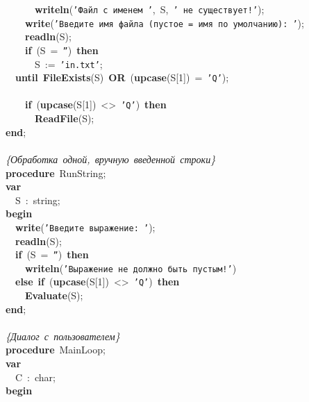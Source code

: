 \mbox{}\ \ \ \ \ \ \textbf{writeln}(\texttt{'Файл\ с\ именем\ '},\ S,\ \texttt{'\ не\ существует!'}); \\
\mbox{}\ \ \ \ \textbf{write}(\texttt{'Введите\ имя\ файла\ (пустое\ =\ имя\ по\ умолчанию):\ '}); \\
\mbox{}\ \ \ \ \textbf{readln}(S); \\
\mbox{}\ \ \ \ \textbf{if}\ (S\ =\ \texttt{''})\ \textbf{then} \\
\mbox{}\ \ \ \ \ \ S\ :=\ \texttt{'in.txt'}; \\
\mbox{}\ \ \textbf{until}\ \textbf{FileExists}(S)\ \textbf{OR}\ (\textbf{upcase}(S[1])\ =\ \texttt{'Q'}); \\
\mbox{} \\
\mbox{}\ \ \ \ \textbf{if}\ (\textbf{upcase}(S[1])\ \textless{}\textgreater{}\ \texttt{'Q'})\ \textbf{then} \\
\mbox{}\ \ \ \ \ \ \textbf{ReadFile}(S); \\
\mbox{}\textbf{end}; \\
\mbox{} \\
\mbox{}\textit{\{Обработка\ одной,\ вручную\ введенной\ строки\}} \\
\mbox{}\textbf{procedure}\ RunString; \\
\mbox{}\textbf{var} \\
\mbox{}\ \ S\ :\ string; \\
\mbox{}\textbf{begin} \\
\mbox{}\ \ \textbf{write}(\texttt{'Введите\ выражение:\ '}); \\
\mbox{}\ \ \textbf{readln}(S); \\
\mbox{}\ \ \textbf{if}\ (S\ =\ \texttt{''})\ \textbf{then} \\
\mbox{}\ \ \ \ \textbf{writeln}(\texttt{'Выражение\ не\ должно\ быть\ пустым!'}) \\
\mbox{}\ \ \textbf{else}\ \textbf{if}\ (\textbf{upcase}(S[1])\ \textless{}\textgreater{}\ \texttt{'Q'})\ \textbf{then} \\
\mbox{}\ \ \ \ \textbf{Evaluate}(S); \\
\mbox{}\textbf{end}; \\
\mbox{} \\
\mbox{}\textit{\{Диалог\ с\ пользователем\}} \\
\mbox{}\textbf{procedure}\ MainLoop; \\
\mbox{}\textbf{var} \\
\mbox{}\ \ C\ :\ char; \\
\mbox{}\textbf{begin} \\
